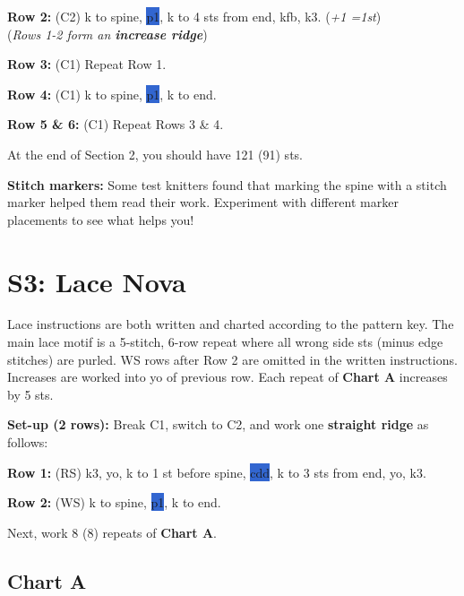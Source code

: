 \documentclass[12pt]{article}
\newcommand{\rowDir}[1]{\hspace{-2em} \textbf{#1:}} %
\newcommand{\spine}[1]{\colorbox{highlight}{#1}} %
\newcommand{\increase}[1]{(\emph{+#1 
	\ifnum#1=1{st}\else{sts}\fi})}
\newenvironment{frnote}
    {%
    	\setlength{\FrameRule}{1.5pt}
    	\def\FrameCommand{\fboxrule=\FrameRule\fboxsep=\FrameSep \fcolorbox{framecolor}{shadecolor}}
    	\MakeFramed {\FrameRestore}}
    {\setlength{\FrameRule}{1pt}
	\endMakeFramed}
\newenvironment{frdirection}
    {%
	\def\FrameCommand{\fboxrule=\FrameRule\fboxsep=\FrameSep \fbox}
   	\MakeFramed {\advance\hsize-\width \FrameRestore}
    	\addmargin[2em]{0pt}}
    {\endaddmargin
	\endMakeFramed}
\newenvironment{unframed}
    {%
	\begin{addmargin}[1cm]{0pt}}
    {	\end{addmargin}}
\begin{document}
\begin{multicols}{2}
\begin{frdirection}
\rowDir{Row 2} (C2) k to spine, \spine{p1}, k to 4 sts from end, kfb, k3. \increase{1}
\\ (\emph{Rows 1-2 form an \textbf{increase ridge}})

\rowDir{Row 3} (C1) Repeat Row 1.

\rowDir{Row 4} (C1) k to spine, \spine{p1}, k to end.

\rowDir{Row 5 \& 6} (C1) Repeat Rows 3 \& 4.
\end{frdirection}

At the end of Section 2, you should have 121 (91) sts. 

\begin{frnote}
\textbf{Stitch markers:} Some test knitters found that marking the spine with a stitch marker helped them read their work. Experiment with different marker placements to see what helps you!
\end{frnote}

\section*{S3: Lace Nova}
Lace instructions are both written and charted according to the pattern key. The main lace motif is a 5-stitch, 6-row repeat where all wrong side sts (minus edge stitches) are purled. WS rows after Row 2 are omitted in the written instructions. Increases are worked into yo of previous row. Each repeat of \textbf{Chart A} increases by 5 sts.

\begin{unframed} \rowDir{Set-up (2 rows)} Break C1, switch to C2, and work one \textbf{straight ridge} as follows: \end{unframed}
\begin{frdirection}
\rowDir{Row 1} (RS) k3, yo, k to 1 st before spine, \spine{cdd},  k to 3 sts from end, yo, k3.

\rowDir{Row 2} (WS) k to spine, \spine{p1}, k to end.
\end{frdirection}

Next, work 8 (8) repeats of \textbf{Chart A}. \vspace{-1em}

\newpage
\end{multicols}

\subsection*{Chart A}
\end{document}
